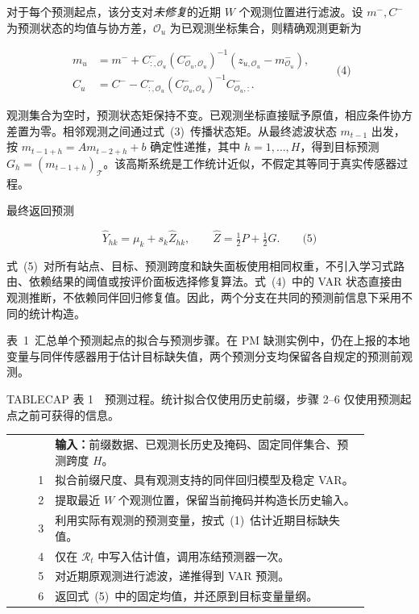 对于每个预测起点，该分支对\emph{未修复}的近期 $W$ 个观测位置进行滤波。设 $m^-,C^-$ 为预测状态的均值与协方差，$\mathcal O_u$ 为已观测坐标集合，则精确观测更新为


\[\begin{aligned}m_u&=m^-+C^-_{:,\mathcal O_u}(C^-_{\mathcal O_u,\mathcal O_u})^{-1}
          (z_{u,\mathcal O_u}-m^-_{\mathcal O_u}),\\
 C_u&=C^- - C^-_{:,\mathcal O_u}(C^-_{\mathcal O_u,\mathcal O_u})^{-1}C^-_{\mathcal O_u,:}.\end{aligned}\qquad\text{(4)}\]


观测集合为空时，预测状态矩保持不变。已观测坐标直接赋予原值，相应条件协方差置为零。相邻观测之间通过式~(3)~传播状态矩。从最终滤波状态 $m_{t-1}$ 出发，按 $m_{t-1+h}=Am_{t-2+h}+b$ 确定性递推，其中 $h=1,\ldots,H$，得到目标预测 $G_h=(m_{t-1+h})_{\mathcal T}$。该高斯系统是工作统计近似，不假定其等同于真实传感器过程。

最终返回预测


\[\widehat Y_{hk}=\mu_k+s_k\widehat Z_{hk},\qquad
 \widehat Z=\tfrac12P+\tfrac12G.\qquad\text{(5)}\]


式~(5)~对所有站点、目标、预测跨度和缺失面板使用相同权重，不引入学习式路由、依赖结果的阈值或按评价面板选择修复算法。式~(4)~中的 VAR 状态直接由观测推断，不依赖同伴回归修复值。因此，两个分支在共同的预测前信息下采用不同的统计构造。

表~1~汇总单个预测起点的拟合与预测步骤。在 PM 缺测实例中，仍在上报的本地变量与同伴传感器用于估计目标缺失值，两个预测分支均保留各自规定的预测前观测。



TABLECAP 表 1　预测过程。统计拟合仅使用历史前缀，步骤 2--6 仅使用预测起点之前可获得的信息。

\begin{tabular}{r p{0.88\linewidth}}
\toprule
 & \textbf{输入：}前缀数据、已观测长历史及掩码、固定同伴集合、预测跨度 $H$。\\
1 & 拟合前缀尺度、具有观测支持的同伴回归模型及稳定 VAR。\\
2 & 提取最近 $W$ 个观测位置，保留当前掩码并构造长历史输入。\\
3 & 利用实际有观测的预测变量，按式~(1)~估计近期目标缺失值。\\
4 & 仅在 $\mathcal R_t$ 中写入估计值，调用冻结预测器一次。\\
5 & 对近期原观测进行滤波，递推得到 VAR 预测。\\
6 & 返回式~(5)~中的固定均值，并还原到目标变量量纲。\\
\bottomrule
\end{tabular}



